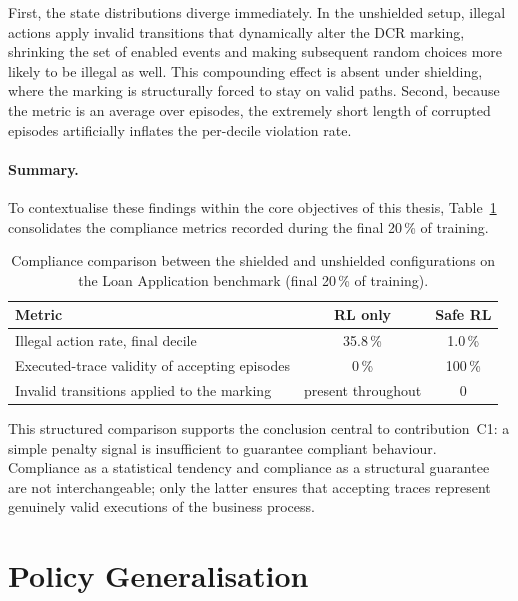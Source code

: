First, the state distributions diverge immediately. In the unshielded setup, illegal actions apply invalid transitions that dynamically alter the DCR marking, shrinking the set of enabled events and making subsequent random choices more likely to be illegal as well. This compounding effect is absent under shielding, where the marking is structurally forced to stay on valid paths. Second, because the metric is an average over episodes, the extremely short length of corrupted episodes artificially inflates the per-decile violation rate.

\paragraph{Summary.}
To contextualise these findings within the core objectives of this thesis, Table~\ref{tab:ablation_compliance} consolidates the compliance metrics recorded during the final 20\,\% of training.

\begin{table}[H]
\centering
\caption{Compliance comparison between the shielded and unshielded configurations on the Loan Application benchmark (final 20\,\% of training).}
\label{tab:ablation_compliance}
{\renewcommand{\arraystretch}{1.5}
\setlength{\tabcolsep}{6pt}
\begin{tabular}{lcc}
\toprule
\textbf{Metric} & \textbf{\ac{RL} only} & \textbf{Safe \ac{RL}} \\
\midrule
Illegal action rate, final decile & 35.8\,\% & 1.0\,\% \\
Executed-trace validity of accepting episodes & 0\,\% & 100\,\% \\
Invalid transitions applied to the marking & present throughout & 0 \\
\bottomrule
\end{tabular}}
\end{table}

This structured comparison supports the conclusion central to contribution~C1: a simple penalty signal is insufficient to guarantee compliant behaviour. Compliance as a statistical tendency and compliance as a structural guarantee are not interchangeable; only the latter ensures that accepting traces represent genuinely valid executions of the business process.

\section{Policy Generalisation}
\label{sec:policy_generalisation}

